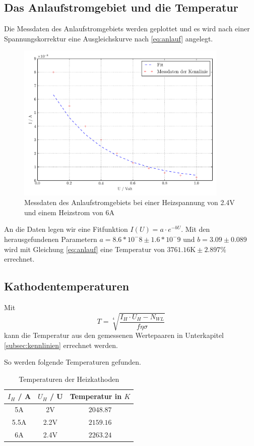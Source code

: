 \subsection{Das Anlaufstromgebiet und die Temperatur}
\label{subsec:c}
Die Messdaten des Anlaufstromgebiets werden geplottet und es wird nach einer Spannungskorrektur eine Ausgleichskurve nach \eqref{eq:anlauf} angelegt.
\begin{figure}[H]
  \centering
  \includegraphics[width=0.9\textwidth]{build/Kennlinie3.pdf}
  \caption{Messdaten des Anlaufstromgebiets bei einer Heizspannung von 2.4V und einem Heizstrom von 6A \cite{sample}}
  \label{fig:kenn3}
\end{figure}
An die Daten legen wir eine Fitfunktion $I (U) =a \cdot e^{-b U}$. Mit den herausgefundenen Parametern $a= 8.6*10^-8 \pm 1.6*10^-9$ und $b=3.09 \pm 0.089$ wird mit Gleichung
\eqref{eq:anlauf} eine Temperatur von $3761.16 \mathrm{K} \pm 2.897 \%$ errechnet.


\subsection{Kathodentemperaturen}
\label{subsec:d}
Mit 
\begin{equation}
T = \sqrt[4]{\frac{I_H \cdot U_H - N_{WL}}{f \eta \sigma}}
\label{eq:kenn1ergebnis}
\end{equation}
\cite{sample} kann die Temperatur aus den gemessenen Wertepaaren in Unterkapitel \ref{subsec:kennlinien} errechnet werden.

So werden folgende Temperaturen gefunden.
\begin{table}
 \centering
 \caption{Temperaturen der Heizkathoden}
 \label{tab:datenaustritt}
 \begin{tabular}{|c c c|}  
 \toprule
$I_H$ / A & $U_H$ / U & Temperatur in $K$\\
\midrule
5A & 2V & $2048.87$\\
5.5A & 2.2V & $2159.16$\\
6A & 2.4V & $2263.24$\\
\bottomrule
\end{tabular}
\end{table}

